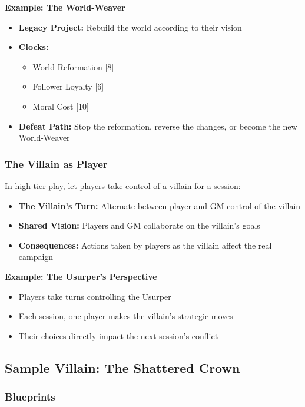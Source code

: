\textbf{Example: The World-Weaver}
\begin{itemize}
  \item \textbf{Legacy Project:} Rebuild the world according to their vision
  \item \textbf{Clocks:}
    \begin{itemize}
      \item World Reformation [8]
      \item Follower Loyalty [6]
      \item Moral Cost [10]
    \end{itemize}
  \item \textbf{Defeat Path:} Stop the reformation, reverse the changes, or become the new World-Weaver
\end{itemize}

\subsubsection{The Villain as Player}

In high-tier play, let players take control of a villain for a session:

\begin{itemize}
  \item \textbf{The Villain's Turn:} Alternate between player and GM control of the villain
  \item \textbf{Shared Vision:} Players and GM collaborate on the villain's goals
  \item \textbf{Consequences:} Actions taken by players as the villain affect the real campaign
\end{itemize}

\textbf{Example: The Usurper's Perspective}
\begin{itemize}
  \item Players take turns controlling the Usurper
  \item Each session, one player makes the villain's strategic moves
  \item Their choices directly impact the next session's conflict
\end{itemize}

\subsection{Sample Villain: The Shattered Crown}

\subsubsection{Blueprints}

